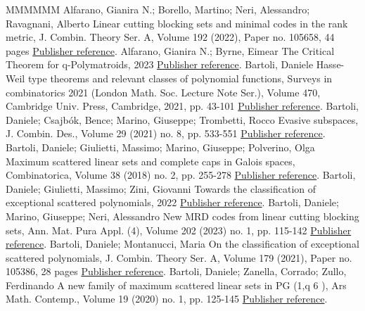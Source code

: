 \begin{thebibliography}{MMMMMM}
 Alfarano, Gianira N.; Borello, Martino; Neri, Alessandro; Ravagnani, Alberto Linear cutting blocking sets and minimal codes in the rank metric, J. Combin. Theory Ser. A, Volume 192 (2022), Paper no. 105658, 44 pages \href{https://alco.centre-mersenne.org/articles/10.5802/alco.377/#ABNR22}{Publisher reference}.
 Alfarano, Gianira N.; Byrne, Eimear The Critical Theorem for q-Polymatroids, 2023 \href{https://alco.centre-mersenne.org/articles/10.5802/alco.377/#alfarano2023critical}{Publisher reference}.
 Bartoli, Daniele Hasse-Weil type theorems and relevant classes of polynomial functions, Surveys in combinatorics 2021 (London Math. Soc. Lecture Note Ser.), Volume 470, Cambridge Univ. Press, Cambridge, 2021, pp. 43-101 \href{https://alco.centre-mersenne.org/articles/10.5802/alco.377/#Bartoli:2020aa4}{Publisher reference}.
 Bartoli, Daniele; Csajbók, Bence; Marino, Giuseppe; Trombetti, Rocco Evasive subspaces, J. Combin. Des., Volume 29 (2021) no. 8, pp. 533-551 \href{https://alco.centre-mersenne.org/articles/10.5802/alco.377/#bartoli2021evasive}{Publisher reference}.
 Bartoli, Daniele; Giulietti, Massimo; Marino, Giuseppe; Polverino, Olga Maximum scattered linear sets and complete caps in Galois spaces, Combinatorica, Volume 38 (2018) no. 2, pp. 255-278 \href{https://alco.centre-mersenne.org/articles/10.5802/alco.377/#BGMP}{Publisher reference}.
 Bartoli, Daniele; Giulietti, Massimo; Zini, Giovanni Towards the classification of exceptional scattered polynomials, 2022 \href{https://alco.centre-mersenne.org/articles/10.5802/alco.377/#bartoli2022towards}{Publisher reference}.
 Bartoli, Daniele; Marino, Giuseppe; Neri, Alessandro New MRD codes from linear cutting blocking sets, Ann. Mat. Pura Appl. (4), Volume 202 (2023) no. 1, pp. 115-142 \href{https://alco.centre-mersenne.org/articles/10.5802/alco.377/#BMN2022}{Publisher reference}.
 Bartoli, Daniele; Montanucci, Maria On the classification of exceptional scattered polynomials, J. Combin. Theory Ser. A, Volume 179 (2021), Paper no. 105386, 28 pages \href{https://alco.centre-mersenne.org/articles/10.5802/alco.377/#MR4190573}{Publisher reference}.
 Bartoli, Daniele; Zanella, Corrado; Zullo, Ferdinando A new family of maximum scattered linear sets in  PG (1,q 6 ), Ars Math. Contemp., Volume 19 (2020) no. 1, pp. 125-145 \href{https://alco.centre-mersenne.org/articles/10.5802/alco.377/#MR4173668}{Publisher reference}.

\end{thebibliography}
